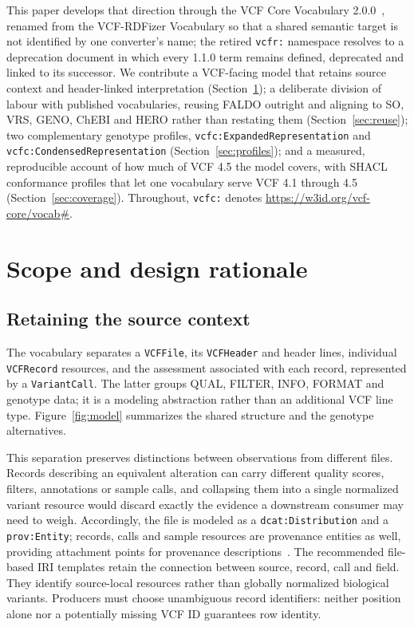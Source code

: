 \documentclass{ceurart}
\newcommand{\term}[1]{\texttt{#1}}
\begin{document}
This paper develops that direction through the VCF Core Vocabulary 2.0.0~\cite{vcfc200}, renamed from the VCF-RDFizer Vocabulary so that a shared semantic target is not identified by one converter's name; the retired \term{vcfr:} namespace resolves to a deprecation document in which every 1.1.0 term remains defined, deprecated and linked to its successor. We contribute a VCF-facing model that retains source context and header-linked interpretation (Section~\ref{sec:design}); a deliberate division of labour with published vocabularies, reusing FALDO outright and aligning to SO, VRS, GENO, ChEBI and HERO rather than restating them (Section~\ref{sec:reuse}); two complementary genotype profiles, \term{vcfc:ExpandedRepresentation} and \term{vcfc:CondensedRepresentation} (Section~\ref{sec:profiles}); and a measured, reproducible account of how much of VCF 4.5 the model covers, with SHACL conformance profiles that let one vocabulary serve VCF 4.1 through 4.5 (Section~\ref{sec:coverage}). Throughout, \term{vcfc:} denotes \url{https://w3id.org/vcf-core/vocab#}.

\section{Scope and design rationale}
\label{sec:design}

\subsection{Retaining the source context}

The vocabulary separates a \term{VCFFile}, its \term{VCFHeader} and header lines, individual \term{VCFRecord} resources, and the assessment associated with each record, represented by a \term{VariantCall}. The latter groups QUAL, FILTER, INFO, FORMAT and genotype data; it is a modeling abstraction rather than an additional VCF line type. Figure~\ref{fig:model} summarizes the shared structure and the genotype alternatives.

This separation preserves distinctions between observations from different files. Records describing an equivalent alteration can carry different quality scores, filters, annotations or sample calls, and collapsing them into a single normalized variant resource would discard exactly the evidence a downstream consumer may need to weigh. Accordingly, the file is modeled as a \term{dcat:Distribution} and a \term{prov:Entity}; records, calls and sample resources are provenance entities as well, providing attachment points for provenance descriptions~\cite{prov2013}. The recommended file-based IRI templates retain the connection between source, record, call and field. They identify source-local resources rather than globally normalized biological variants. Producers must choose unambiguous record identifiers: neither position alone nor a potentially missing VCF ID guarantees row identity.
\end{document}
